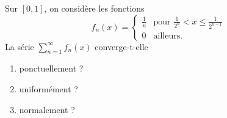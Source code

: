 

\begin{exercice}\label{exo_I-1-10}

Sur $[0,1]$, on considère les fonctions
\begin{equation}
	f_n(x)=
\begin{cases}
	\frac{ 1 }{ n }	&	\text{pour $\frac{ 1 }{ 2^n }<x\leq \frac{ 1 }{ 2^{n-1} }$}\\
	0	&	 \text{ailleurs.}
\end{cases}
\end{equation}
La série $\sum_{n=1}^{\infty}f_n(x)$ converge-t-elle
\begin{enumerate}
\item ponctuellement ?
\item uniformément ?
\item normalement ?
\end{enumerate}

\end{exercice}
